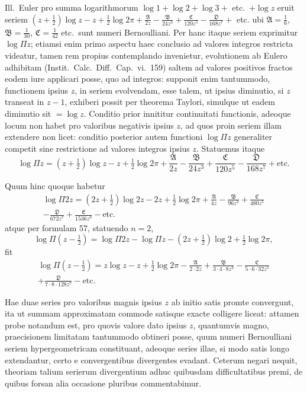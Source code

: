 \documentclass[12pt,a4paper]{article}
\begin{document}
Ill.\ Euler pro summa logarithmorum $\log1+\log2+\log3+$ etc.\ $+\log z$ eruit seriem $(z+\frac{1}{2})\log z-z+\frac{1}{2}\log2\pi+\frac{\mathfrak{A}}{2z}-\frac{\mathfrak{B}}{24z^3}+\frac{\mathfrak{C}}{120z^5}-\frac{\mathfrak{D}}{168z^7}+$ etc.
ubi $\mathfrak{A}=\frac{1}{6}$, $\mathfrak{B}=\frac{1}{30}$, $\mathfrak{C}=\frac{1}{42}$ etc.\ sunt numeri Bernoulliani. Per hanc itaque seriem exprimitur $\log\Pi z$; etiamsi enim primo aspectu haec conclusio ad valores integros restricta videatur, tamen rem propius contemplando invenietur, evolutionem ab Eulero adhibitam (Instit.\ Calc.\ Diff.\ Cap.\ vi.\ 159) saltem ad valores positivos fractos eodem iure applicari posse, quo ad integros: supponit enim tantummodo, functionem ipsius $z$, in seriem evolvendam, esse talem, ut ipsius diminutio, si $z$ transeat in $z-1$, exhiberi possit per theorema Taylori, simulque ut eadem diminutio sit $=\log z$. Conditio prior innititur continuitati functionis, adeoque locum non habet pro valoribus negativis ipsius $z$, ad quos proin seriem illam extendere non licet: conditio posterior autem functioni $\log\Pi z$ generaliter competit sine restrictione ad valores integros ipsius $z$. Statuemus itaque
\begin{equation}
\log\Pi z = (z+\tfrac{1}{2})\log z - z + \tfrac{1}{2}\log2\pi + \frac{\mathfrak{A}}{2z} - \frac{\mathfrak{B}}{24z^3} + \frac{\mathfrak{C}}{120z^5} - \frac{\mathfrak{D}}{168z^7} + \text{etc.}\tag{[58]}
\end{equation}

Quum hinc quoque habetur
\begin{multline*}
\log\Pi2z = (2z+\tfrac{1}{2})\log2z - 2z + \tfrac{1}{2}\log2\pi + \frac{\mathfrak{A}}{4z} - \frac{\mathfrak{B}}{96z^3} + \frac{\mathfrak{C}}{480z^5}\\
- \frac{\mathfrak{D}}{672z^7} + \frac{\mathfrak{E}}{1536z^9} - \text{etc.}
\end{multline*}
atque per formulam 57, statuendo $n=2$,
\[
\log\Pi(z-\tfrac{1}{2}) = \log\Pi2z - \log\Pi z - (2z+\tfrac{1}{2})\log2 + \tfrac{1}{2}\log2\pi,
\]
fit
\begin{multline}
\log\Pi(z-\tfrac{1}{2}) = z\log z - z + \tfrac{1}{2}\log2\pi - \frac{\mathfrak{A}}{2\cdot2z} + \frac{\mathfrak{B}}{3\cdot4\cdot8z^3} - \frac{\mathfrak{C}}{5\cdot6\cdot32z^5}\\
+ \frac{\mathfrak{D}}{7\cdot8\cdot128z^7} - \text{etc.}\tag{[59]}
\end{multline}

Hae duae series pro valoribus magnis ipsius $z$ ab initio satis promte convergunt, ita ut summam approximatam commode satisque exacte colligere liceat: attamen probe notandum est, pro quovis valore dato ipsius $z$, quantumvis magno, praecisionem limitatam tantummodo obtineri posse, quum numeri Bernoulliani seriem hypergeometricam constituant, adeoque series illae, si modo satis longo extendantur, certo e convergentibus divergentes evadant. Ceterum negari nequit, theoriam talium serierum divergentium adhuc quibusdam difficultatibus premi, de quibus forsan alia occasione pluribus commentabimur.
\end{document}
